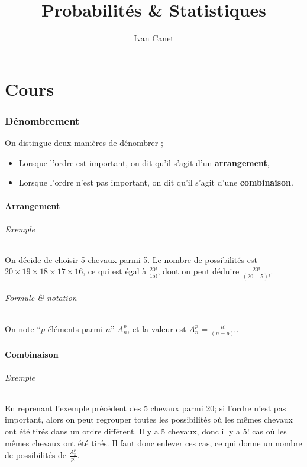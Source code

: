 \documentclass[10pt,a4paper,french]{article}
\begin{document}
\title{Probabilités \& Statistiques}
\author{Ivan Canet}
\maketitle

\tableofcontents

\part{Cours}

\section{Dénombrement}

On distingue deux manières de dénombrer ;

\begin{itemize}
\item Lorsque l'ordre est important, on dit qu'il s'agit d'un \textbf{arrangement},
\item Lorsque l'ordre n'est pas important, on dit qu'il s'agit d'une \textbf{combinaison}.
\end{itemize}

\subsection{Arrangement}

\paragraph{Exemple}
On décide de choisir 5 chevaux parmi 5. Le nombre de possibilités est $20 \times 19 \times 18 \times 17 \times 16$, ce qui est égal à $\frac{20!}{15!}$, dont on peut déduire $\frac{20!}{(20-5)!}$.

\paragraph{Formule \& notation}
On note ``$p$ éléments parmi $n$'' $A_n^p$, et la valeur est $A_n^p = \frac{n!}{(n-p)!}$.

\subsection{Combinaison}

\paragraph{Exemple}
En reprenant l'exemple précédent des 5 chevaux parmi 20; si l'ordre n'est pas important, alors on peut regrouper toutes les possibilités où les mêmes chevaux ont été tirés dans un ordre différent. Il y a 5 chevaux, donc il y a $5!$ cas où les mêmes chevaux ont été tirés. Il faut donc enlever ces cas, ce qui donne un nombre de possibilités de $\frac{A_n^p}{p!}$.
\end{document}
